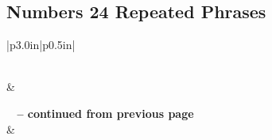 \subsection{Numbers 24 Repeated Phrases}


\normalsize
 
\begin{center}
\begin{longtable}{|p{3.0in}|p{0.5in}|}
\caption[Numbers 24 Repeated Phrases]{Numbers 24 Repeated Phrases}\label{table:Repeated Phrases Numbers 24} \\
\hline {} &  \\ \hline 
\endfirsthead
 
{{\bfseries \tablename\ \thetable{} -- continued from previous page}} \\  
\hline {} &  \\ \hline 
\endhead
 

\end{longtable}
\end{center}
